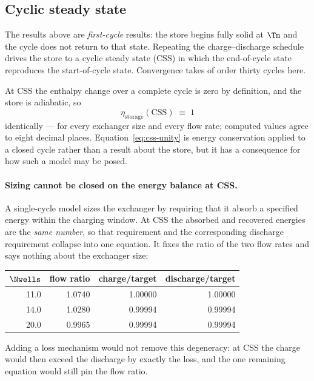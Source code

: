 \subsection{Cyclic steady state}
\label{sec:css}

The results above are \emph{first-cycle} results: the store begins fully solid
at $\Tm$ and the cycle does not return to that state. Repeating the
charge--discharge schedule drives the store to a cyclic steady state (CSS) in
which the end-of-cycle state reproduces the start-of-cycle state. Convergence
takes of order thirty cycles here.

At CSS the enthalpy change over a complete cycle is zero by definition, and the
store is adiabatic, so
\begin{equation}
  \eta_{\mathrm{storage}}(\mathrm{CSS}) \;\equiv\; 1
  \label{eq:css-unity}
\end{equation}
identically --- for every exchanger size and every flow rate; computed values
agree to eight decimal places. Equation~\eqref{eq:css-unity} is energy
conservation applied to a closed cycle rather than a result about the store, but
it has a consequence for how such a model may be posed.

\paragraph{Sizing cannot be closed on the energy balance at CSS.}
A single-cycle model sizes the exchanger by requiring that it absorb a specified
energy within the charging window. At CSS the absorbed and recovered energies
are the \emph{same number}, so that requirement and the corresponding discharge
requirement collapse into one equation. It fixes the ratio of the two flow rates
and says nothing about the exchanger size:

\begin{center}
\begin{tabular}{@{}r r r r@{}}
\toprule
$\Nwells$ & flow ratio & charge/target & discharge/target \\
\midrule
11.0 & 1.0740 & 1.00000 & 1.00000 \\
14.0 & 1.0280 & 0.99994 & 0.99994 \\
20.0 & 0.9965 & 0.99994 & 0.99994 \\
\bottomrule
\end{tabular}
\end{center}

\noindent
Adding a loss mechanism would not remove this degeneracy: at CSS the charge
would then exceed the discharge by exactly the loss, and the one remaining
equation would still pin the flow ratio.

